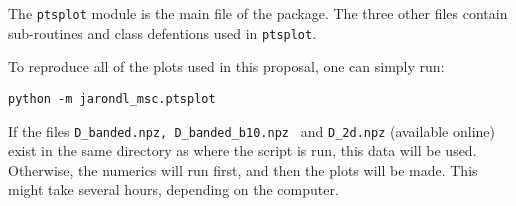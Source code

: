The \texttt{ptsplot} module is the main file of the package. The three other files contain
sub-routines and class defentions used in \texttt{ptsplot}.


To reproduce all of the plots used in this proposal, one can simply run:
\begin{verbatim}
python -m jarondl_msc.ptsplot
\end{verbatim}
If the files \texttt{D\_banded.npz, D\_banded\_b10.npz } and \texttt{D\_2d.npz} (available online)
exist in the same directory as where the script is run,
this data will be used. Otherwise, the numerics will run first, and then the plots will be made. This might take several hours,
depending on the computer.



